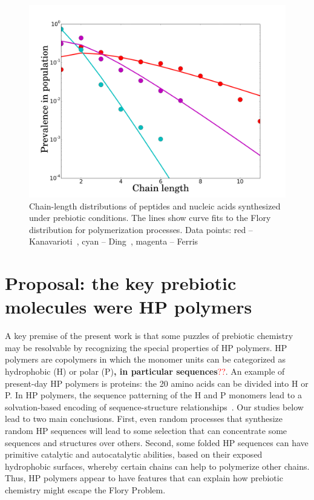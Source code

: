 \documentclass[journal=jacsat,manuscript=article,layout=twocolumn]{achemso}
\newcommand*{\red}[1]{\textcolor{red}{#1}}
\begin{document}
\begin{figure}[h!]
  \centering
  \includegraphics[width=\columnwidth]{pictures/some_flory.pdf} 
  \caption{Chain-length distributions of peptides and nucleic acids synthesized under prebiotic 
conditions.  The lines show curve fits to the Flory distribution for polymerization processes. Data 
points: red -- Kanavarioti~\cite{Kanavarioti2001}, cyan -- Ding~\cite{Ding1996}, 
magenta -- Ferris~\cite{Ferris1999}}
  \label{fig:some_flory}
\end{figure}


\section{Proposal: the key prebiotic molecules were HP polymers}

 A key premise of the present work is that some puzzles of prebiotic chemistry may be 
 resolvable by recognizing the special properties of HP polymers.  HP polymers are copolymers in 
which the monomer units can be categorized as hydrophobic (H) or polar (P)\textbf{, in particular 
sequences}\red{??}. 
 An example of present-day HP polymers is proteins: the 20 amino acids can be divided into H or P.  
In HP polymers, the sequence patterning of the H and P monomers lead to a solvation-based encoding 
of sequence-structure relationships~\cite{Chan1991}.  Our studies below lead to two main 
conclusions.  First, 
even random processes that synthesize random HP sequences will lead to some selection that can 
concentrate some sequences and structures over others.  Second, some folded HP sequences can have 
primitive catalytic and autocatalytic abilities, based on their exposed hydrophobic surfaces, 
whereby certain chains can help to polymerize other chains.  Thus, HP polymers appear to have 
features that can explain how prebiotic chemistry might escape the Flory Problem.  
\end{document}
